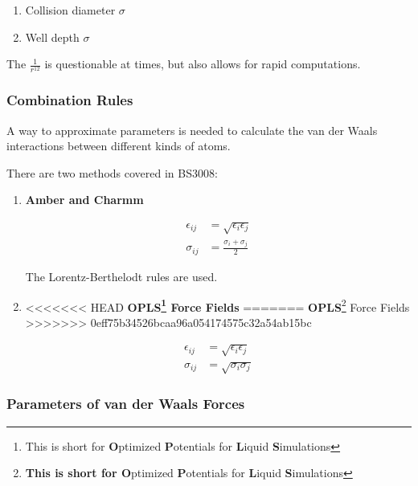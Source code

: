 \documentclass[
  letterpaper,
  DIV=11,
  numbers=noendperiod]{scrreprt}
\providecommand{\tightlist}{%
  \setlength{\itemsep}{0pt}\setlength{\parskip}{0pt}}\usepackage{longtable,booktabs,array}
\begin{document}
\begin{enumerate}
\def\labelenumi{\arabic{enumi}.}
\tightlist
\item
  Collision diameter \(\sigma\)
\item
  Well depth \(\sigma\)
\end{enumerate}

The \(\displaystyle \frac{1}{r^{12}}\) is questionable at times, but
also allows for rapid computations.

\hypertarget{combination-rules}{%
\subsubsection{Combination Rules}\label{combination-rules}}

A way to approximate parameters is needed to calculate the van der Waals
interactions between different kinds of atoms.

There are two methods covered in BS3008:

\begin{enumerate}
\def\labelenumi{\arabic{enumi}.}
\item
  \textbf{Amber and Charmm}

  \begin{align}
    \epsilon_{ij} &= \sqrt{\epsilon_i\epsilon_j} \\ 
    \sigma_{ij} &= \frac{\sigma_i + \sigma_j}{2}
  \end{align}

  The Lorentz-Berthelodt rules are used.
\item
<<<<<<< HEAD
  \textbf{OPLS\footnote{This is short for \textbf{O}ptimized
    \textbf{P}otentials for \textbf{L}iquid \textbf{S}imulations} Force
  Fields}
=======
  \textbf{OPLS}\footnote{\textbf{This is short for O}ptimized
    \textbf{P}otentials for \textbf{L}iquid \textbf{S}imulations} Force
  Fields
>>>>>>> 0eff75b34526bcaa96a054174575c32a54ab15bc

  \begin{align}
    \epsilon_{ij} &= \sqrt{\epsilon_i\epsilon_j} \\ 
    \sigma_{ij} &= \sqrt{\sigma_i\sigma_j}
  \end{align}
\end{enumerate}

\hypertarget{parameters-of-van-der-waals-forces}{%
\subsubsection{Parameters of van der Waals
Forces}\label{parameters-of-van-der-waals-forces}}
\end{document}
